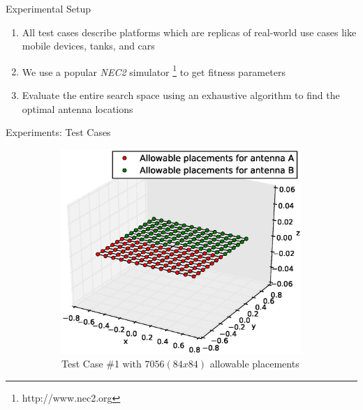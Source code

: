 \documentclass{beamer}
\begin{document}
\begin{frame}[t]{Experimental Setup}
    \begin{enumerate}
        \item All test cases describe platforms which are replicas of real-world use cases like mobile devices, tanks, and cars
        \item We use a popular \textit{NEC2} simulator \footnote{http://www.nec2.org} to get fitness parameters 
        \item Evaluate the entire search space using an exhaustive algorithm to find the optimal antenna locations
    \end{enumerate}
    \vspace{10mm}
\end{frame}


\begin{frame}{Experiments: Test Cases}
    \begin{figure}
        \centering
        \begin{subfigure}{.5\columnwidth}
            \includegraphics[width=\columnwidth,height=\columnwidth]{../paper/FIG/tc1_figure}%
            \caption*{\tiny Test Case \#1 with $7056 (84x84)$ allowable placements}%
        \end{subfigure}\hfill%
        \begin{subfigure}{.5\columnwidth}

\end{subfigure}
\end{figure}
\end{frame}
\end{document}

